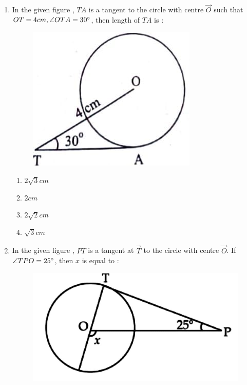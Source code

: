 \begin{enumerate}
\begin{figure}[H]
			\caption{}
			\label{fig:circle8}
		\end{figure}
	\item In the given figure , $ TA $ is a tangent to the circle with centre $ \vec{O} $ such that $ OT = 4 cm , \angle{OTA} = 30{\degree} $, then length of $ TA $ is :
		\begin{figure}[H]
			\centering
			\includegraphics[width=\columnwidth]{figs/circle9.jpg}
			\caption{}
			\label{fig:circle9}
		\end{figure}
		\begin{enumerate}
			\item $ 2\sqrt{3} cm $
			\item $ 2 cm $
			\item $ 2\sqrt{2} cm $
			\item $ \sqrt{3} cm $
		\end{enumerate}
	\item In the given figure , $ PT $ is a tangent at $ \vec{T} $ to the circle with centre $ \vec{O} $. If $ \angle{TPO} = 25{\degree} $, then $ x $ is equal to : 	
		\begin{figure}[H]
			\centering
			\includegraphics[width=\columnwidth]{figs/circle10.jpg}

\end{figure}
\end{enumerate}

